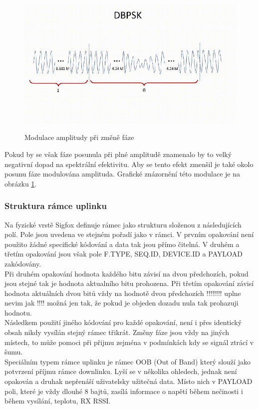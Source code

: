 \documentclass{ctuthesis}
\begin{document}
\begin{figure}
\caption{Modulace amplitudy při změně fáze \cite{sigfoxprotocol}}
\includegraphics[width=1\textwidth]{./images/dbpsk_sigfox.jpg}
\label{dbpsk_sigfox}
\end{figure}
Pokud by se však fáze posunula při plné amplitudě znamenalo by to velký negativní dopad na spektrální efektivitu. Aby se tento efekt zmenšil je také okolo posunu fáze modulována amplituda. Grafické znázornění této modulace je na obrázku \ref{dbpsk_sigfox}.\\

\subsubsection{Struktura rámce uplinku}
Na fyzické vrstě Sigfox definuje rámec jako strukturu složenou z následujících polí. Pole jsou uvedena ve stejném pořadí jako v rámci. V prvním opakování není použito žádné specifické kódování a data tak jsou přímo čitelná. V druhém a třetím opakování jsou však pole F.TYPE, SEQ.ID, DEVICE.ID a PAYLOAD zakódovány.\\
Při druhém opakování hodnota každého bitu závisí na dvou předchozích, pokud jsou stejné tak je hodnota aktualního bitu prohozena. Při třetím opakování závisí hodnota aktuálních dvou bitů vždy na hodnotě dvou předchozích !!!!!!!! uplne nevim jak !!!! možná jen tak, že pokud je objeden dozadu nula tak prohazuji hodnotu.\\
Následkem použití jiného kódování pro každé opakování, není i přes identický obsah nikdy vysílán stejný rámec třikrát. Změny fáze jsou vždy na jiných místech, to může pomoci při přijmu zejména v podmínkách kdy se signál ztrácí v šumu.\\
Speciálním typem rámce uplinku je rámec OOB (Out of Band) který slouží jako potvrzení příjmu rámce downlinku. Lyší se v několika ohledech, jednak není opakován a druhak nepřenáší uživatelsky užitečná data. Místo nich v PAYLOAD poli, které je vždy dlouhé 8 bajtů, zasílá informace o napětí během nečinosti i během vysílání, teplotu, RX RSSI.
\end{document}
